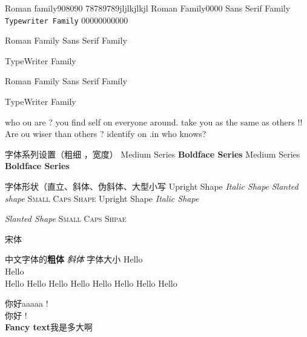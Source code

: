 \documentclass[20pt]{article}
\begin{document}
	\textrm{Roman family908090} 
	78789789jljlkjlkjl
	\rmfamily Roman Family0000
	\textsf{Sans Serif Family} 
	\texttt{Typewriter Family} 
	00000000000
	
	\rmfamily Roman Family {\sffamily Sans Serif Family} 
	
	{\ttfamily TypeWriter Family }
	
	{	\rmfamily Roman Family} {\sffamily Sans Serif Family} 
	
	{\ttfamily TypeWriter Family }
	
	
	
	\sffamily who ou are ? you find self on everyone around. take you as the same as others !! 
	\ttfamily Are ou wiser than others ? identify on .in 
	who knows? 



 字体系列设置（粗细 ，宽度） 
\textmd{Medium Series}  \textbf{Boldface Series } 
{\mdseries Medium Series }  {\bfseries Boldface Series }

字体形状（直立、斜体、伪斜体、大型小写 
\textup{Upright Shape }
\textit{Italic Shape}
\textsl{Slanted shape } \textsc{Small Caps Shape }
{\upshape Upright Shape } {\itshape Italic Shape } 

{\slshape Slanted Shape }
{\scshape Small Caps Shpae }

{\songti 宋体 }

中文字体的\textbf{粗体}
\textit{斜体} 
字体大小 
{\tiny		Hello }\\
{\scriptsize 		Hello }\\
{\footnotesize 		Hello }
{\small		Hello }
{\normalsize 		Hello }
{\large 		Hello }
{\Large		Hello }
{\LARGE 		Hello }
{\huge		Hello }
{\Huge		Hello }

 你好aaaaa  !   \\
 你好  ! \\

\newcommand{\myfont}{\textbf{\textbf{Fancy text}}}
\myfont 我是多大啊\\
\end{document}
